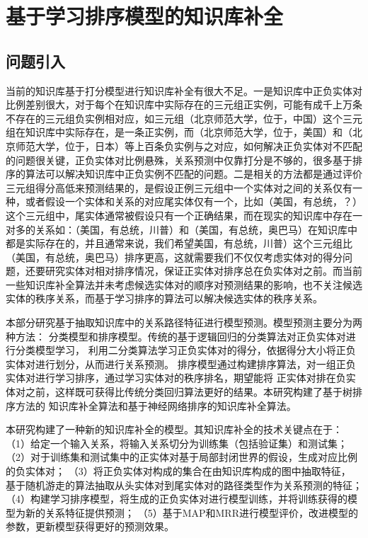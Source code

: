 

\chapter{基于学习排序模型的知识库补全}
\label{cha:kbc-rank}

\section{问题引入}
当前的知识库基于打分模型进行知识库补全有很大不足。一是知识库中正负实体对比例差别很大，对于每个在知识库中实际存在的三元组正实例，可能有成千上万条不存在的三元组负实例相对应，如三元组（北京师范大学，位于，中国）这个三元组在知识库中实际存在，是一条正实例，而（北京师范大学，位于，美国）和（北京师范大学，位于，日本）等上百条负实例与之对应，如何解决正负实体对不匹配的问题很关键，正负实体对比例悬殊，关系预测中仅靠打分是不够的，很多基于排序的算法可以解决知识库中正负实例不匹配的问题。二是相关的方法都是通过评价三元组得分高低来预测结果的，是假设正例三元组中一个实体对之间的关系仅有一种，或者假设一个实体和关系的对应尾实体仅有一个，比如（美国，有总统，？）这个三元组中，尾实体通常被假设只有一个正确结果，而在现实的知识库中存在一对多的关系如：（美国，有总统，川普）和（美国，有总统，奥巴马）在知识库中都是实际存在的，并且通常来说，我们希望美国，有总统，川普）这个三元组比（美国，有总统，奥巴马）排序更高，这就需要我们不仅仅考虑实体对的得分问题，还要研究实体对相对排序情况，保证正实体对排序总在负实体对之前。而当前一些知识库补全算法并未考虑候选实体对的顺序对预测结果的影响，也不关注候选实体的秩序关系，而基于学习排序的算法可以解决候选实体的秩序关系。

本部分研究基于抽取知识库中的关系路径特征进行模型预测。模型预测主要分为两种方法：
分类模型和排序模型。传统的基于逻辑回归的分类算法对正负实体对进行分类模型学习，
利用二分类算法学习正负实体对的得分，依据得分大小将正负实体对进行划分，从而进行关系预测。
排序模型通过构建排序算法，对一组正负实体对进行学习排序，通过学习实体对的秩序排名，期望能将
正实体对排在负实体对之前，这样既可获得比传统分类回归算法更好的结果。本研究构建了基于树排序方法的
知识库补全算法和基于神经网络排序的知识库补全算法。

本研究构建了一种新的知识库补全的模型。其知识库补全的技术关键点在于：
（1）给定一个输入关系，将输入关系切分为训练集（包括验证集）和测试集；
（2）对于训练集和测试集中的正实体对基于局部封闭世界的假设，生成对应比例的负实体对；
（3）将正负实体对构成的集合在由知识库构成的图中抽取特征，
基于随机游走的算法抽取从头实体对到尾实体对的路径类型作为关系预测的特征；
（4）构建学习排序模型，将生成的正负实体对进行模型训练，并将训练获得的模型为新的关系特征提供预测；
（5）基于MAP和MRR进行模型评价，改进模型的参数，更新模型获得更好的预测效果。

